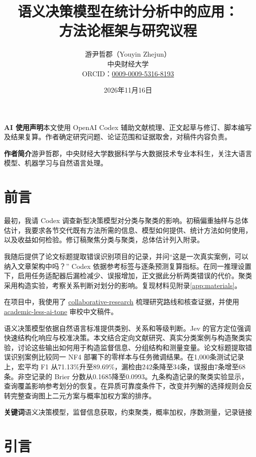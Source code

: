 \documentclass[UTF8,a4paper,zihao=-4,fontset=fandol]{ctexart}
\title{\bfseries 语义决策模型在统计分析中的应用：\\方法论框架与研究议程}
\author{游尹哲郡（Youyin Zhejun）\\[0.3em]
\small 中央财经大学\\
\small ORCID：\href{https://orcid.org/0009-0009-5316-8193}{0009-0009-5316-8193}}
\date{2026年11月16日}
\renewenvironment{abstract}
  {\par\medskip\normalsize{\centering\Large\bfseries\abstractname\par}\smallskip}
  {\par\medskip}
\begin{document}
\maketitle
\thispagestyle{plain}
\noindent\textbf{AI 使用声明}\quad 本文使用 OpenAI Codex 辅助文献梳理、正文起草与修订、脚本编写及结果复算。作者确定研究问题、论证范围和证据取舍，对稿件内容负责。\par\smallskip

\noindent\textbf{作者简介}\quad 游尹哲郡，中央财经大学数据科学与大数据技术专业本科生，关注大语言模型、机器学习与自然语言处理。

\section*{前言}

最初，我请 Codex 调查新型决策模型对分类与聚类的影响。初稿偏重抽样与总体估计，我要求各节交代既有方法所需的信息、模型如何提供、统计方法如何使用，以及收益如何检验。修订稿聚焦分类与聚类，总体估计列入附录。

我随后提供了论文标题提取错误识别项目的记录，并问“这是一次真实案例，可以纳入文章架构中吗？” Codex 依据参考标签与逐条预测复算指标。在同一推理设置下，启用任务适配器后漏检减少、误报增加，正文据此分析两类错误的代价。聚类采用构造实验，考察关系判断对划分的影响。复现材料见附录\ref{app:materials}。

在项目中，我使用了 \href{https://github.com/LeoAndJellyfish/collaborative-dev-research-skills}{collaborative-research} 梳理研究路线和核查证据，并使用 \href{https://github.com/LeoAndJellyfish/academic-less-ai-tone}{academic-less-ai-tone} 审校中文稿件。

\begin{abstract}
语义决策模型依据自然语言标准提供类别、关系和等级判断。Jev 的官方定位强调快速结构化响应与校准决策。本文结合定向文献研究、真实分类案例与构造聚类实验，讨论这些输出如何用于构造监督信息、分组结构和测量变量。论文标题提取错误识别案例比较同一 NF4 部署下的零样本与任务微调结果。在1,000条测试记录上，宏平均 F1 从71.13\%升至89.69\%，漏检由242条降至34条，误报由7条增至68条。非空记录的 Brier 分数从0.1685降至0.0993。九条构造记录的聚类实验显示，查询覆盖影响参考划分的恢复。在异质可靠度条件下，改变并列解的选择规则会反转完整查询图上二元方案与概率加权方案的排序。
\end{abstract}
\noindent\textbf{关键词}\quad 语义决策模型，监督信息获取，约束聚类，概率加权，序数测量，记录链接

\section{引言}\label{sec:intro}
\end{document}
